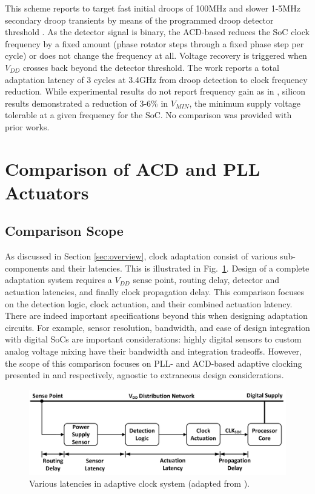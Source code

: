 \documentclass[twoside,9pt,journal,letterpage]{IEEEtran}
\begin{document}
This scheme reports to target fast initial droops of 100MHz and slower 1-5MHz secondary droop transients by means of the programmed droop detector threshold \cite{wilcox2015}. As the detector signal is binary, the ACD-based reduces the SoC clock frequency by a fixed amount (phase rotator steps through a fixed phase step per cycle) or does not change the frequency at all. Voltage recovery is triggered when $V_{DD}$ crosses back beyond the detector threshold. The work reports a total adaptation latency of 3 cycles at 3.4GHz from droop detection to clock frequency reduction. While experimental results do not report frequency gain as in \cite{hashimoto2018}, silicon results demonstrated a reduction of 3-6\% in $V_{MIN}$, the minimum supply voltage tolerable at a given frequency for the SoC. No comparison was provided with prior works.

\section{Comparison of ACD and PLL Actuators}
\label{sec:comparison}

\subsection{Comparison Scope}
\label{sec:Scope of comparison}

As discussed in Section \ref{sec:overview}, clock adaptation consist of various sub-components and their latencies. This is illustrated in Fig.\ \ref{fig:scope}. Design of a complete adaptation system requires a $V_{DD}$ sense point, routing delay, detector and actuation latencies, and finally clock propagation delay. This comparison focuses on the detection logic, clock actuation, and their combined actuation latency. There are indeed important specifications beyond this when designing adaptation circuits. For example, sensor resolution, bandwidth, and ease of design integration with digital SoCs are important considerations: highly digital sensors \cite{hashimoto2018,wilcox2015} to custom analog voltage mixing \cite{kurd2009} have their bandwidth and integration tradeoffs. However, the scope of this comparison focuses on PLL- and ACD-based adaptive clocking presented in \cite{hashimoto2018} and \cite{wilcox2015} respectively, agnostic to extraneous design considerations.

\begin{figure}[h]
	\centering
	\includegraphics[width=\columnwidth]{fig_scope}
	\caption{Various latencies in adaptive clock system (adapted from \cite{hashimoto2018}).}
	\label{fig:scope}
\end{figure}
\end{document}

